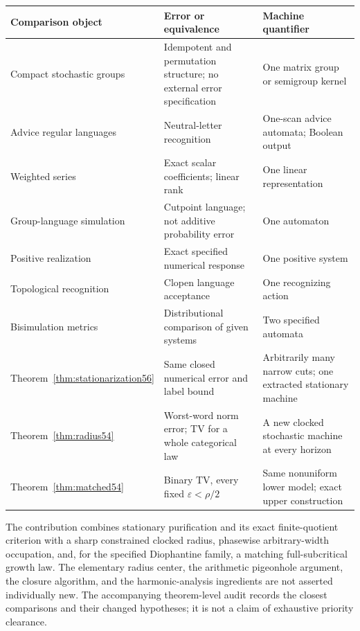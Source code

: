 \begin{center}\small
\begin{tabular}{p{}p{}p{}}
\toprule
Comparison object & Error or equivalence & Machine quantifier\\
\midrule
Compact stochastic groups \cite{Flor} & Idempotent and permutation structure; no external error specification & One matrix group or semigroup kernel\\
Advice regular languages \cite{FP} & Neutral-letter recognition & One-scan advice automata; Boolean output\\
Weighted series \cite{BR} & Exact scalar coefficients; linear rank & One linear representation\\
Group-language simulation \cite{BP} & Cutpoint language; not additive probability error & One automaton\\
Positive realization \cite{BF04} & Exact specified numerical response & One positive system\\
Topological recognition \cite{Steinberg} & Clopen language acceptance & One recognizing action\\
Bisimulation metrics \cite{FSZ} & Distributional comparison of given systems & Two specified automata\\
Theorem~\ref{thm:stationarization56} & Same closed numerical error and label bound & Arbitrarily many narrow cuts; one extracted stationary machine\\
Theorem~\ref{thm:radius54} & Worst-word norm error; TV for a whole categorical law & A new clocked stochastic machine at every horizon\\
Theorem~\ref{thm:matched54} & Binary TV, every fixed $\varepsilon<\rho/2$ & Same nonuniform lower model; exact upper construction\\
\bottomrule
\end{tabular}
\end{center}
The contribution combines stationary purification and its exact finite-quotient criterion with a sharp constrained clocked radius, phasewise arbitrary-width occupation, and, for the specified Diophantine family, a matching full-subcritical growth law. The elementary radius center, the arithmetic pigeonhole argument, the closure algorithm, and the harmonic-analysis ingredients are not asserted individually new. The accompanying theorem-level audit records the closest comparisons and their changed hypotheses; it is not a claim of exhaustive priority clearance.


